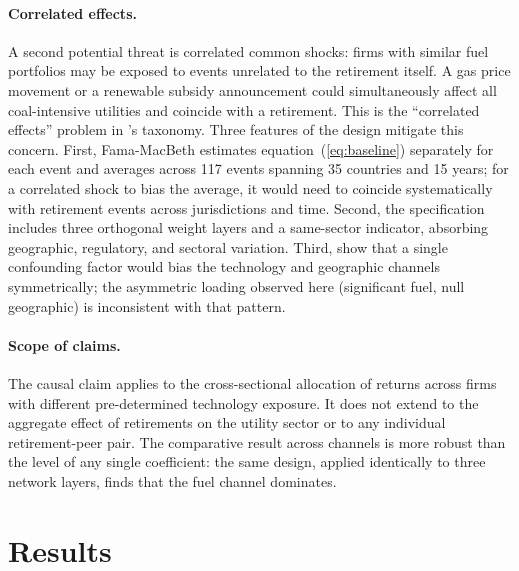 \documentclass[12pt,a4paper]{article}
\begin{document}
\paragraph{Correlated effects.}
A second potential threat is correlated common shocks: firms with similar fuel portfolios may be exposed to events unrelated to the retirement itself. A gas price movement or a renewable subsidy announcement could simultaneously affect all coal-intensive utilities and coincide with a retirement. This is the ``correlated effects'' problem in \citet{Manski1993}'s taxonomy. Three features of the design mitigate this concern. First, Fama-MacBeth estimates equation~(\ref{eq:baseline}) separately for each event and averages across 117 events spanning 35 countries and 15 years; for a correlated shock to bias the average, it would need to coincide systematically with retirement events across jurisdictions and time. Second, the specification includes three orthogonal weight layers and a same-sector indicator, absorbing geographic, regulatory, and sectoral variation. Third, \citet{LangStulz1992} show that a single confounding factor would bias the technology and geographic channels symmetrically; the asymmetric loading observed here (significant fuel, null geographic) is inconsistent with that pattern.

\paragraph{Scope of claims.}
The causal claim applies to the cross-sectional allocation of returns across firms with different pre-determined technology exposure. It does not extend to the aggregate effect of retirements on the utility sector or to any individual retirement-peer pair. The comparative result across channels is more robust than the level of any single coefficient: the same design, applied identically to three network layers, finds that the fuel channel dominates.


\section{Results}\label{sec:results}
\end{document}

